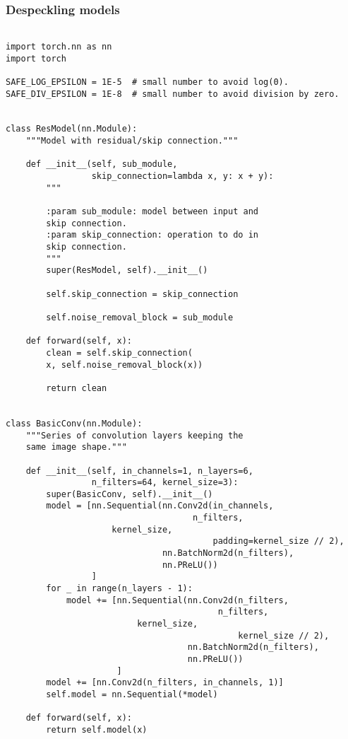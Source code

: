 \documentclass[../main.tex]{subfiles}
\begin{document}
\subsubsection*{Despeckling models}\label{appendix:despeckling}
\begin{lstlisting}

import torch.nn as nn
import torch

SAFE_LOG_EPSILON = 1E-5  # small number to avoid log(0).
SAFE_DIV_EPSILON = 1E-8  # small number to avoid division by zero.


class ResModel(nn.Module):
    """Model with residual/skip connection."""

    def __init__(self, sub_module,
                 skip_connection=lambda x, y: x + y):
        """

        :param sub_module: model between input and
		skip connection.
        :param skip_connection: operation to do in
		skip connection.
        """
        super(ResModel, self).__init__()

        self.skip_connection = skip_connection

        self.noise_removal_block = sub_module

    def forward(self, x):
        clean = self.skip_connection(
		x, self.noise_removal_block(x))

        return clean


class BasicConv(nn.Module):
    """Series of convolution layers keeping the
    same image shape."""

    def __init__(self, in_channels=1, n_layers=6,
                 n_filters=64, kernel_size=3):
        super(BasicConv, self).__init__()
        model = [nn.Sequential(nn.Conv2d(in_channels,
	                                 n_filters,
					 kernel_size,
                                         padding=kernel_size // 2),
                               nn.BatchNorm2d(n_filters),
                               nn.PReLU())
                 ]
        for _ in range(n_layers - 1):
            model += [nn.Sequential(nn.Conv2d(n_filters,
	                                      n_filters,
					      kernel_size,
                                              kernel_size // 2),
                                    nn.BatchNorm2d(n_filters),
                                    nn.PReLU())
                      ]
        model += [nn.Conv2d(n_filters, in_channels, 1)]
        self.model = nn.Sequential(*model)

    def forward(self, x):
        return self.model(x)



\end{lstlisting}
\end{document}
